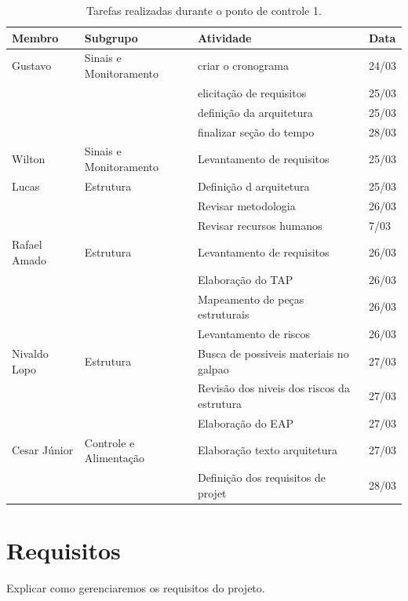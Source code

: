 \begin{table}[!htbp]
  \begin{center}
  \caption{\label{tarefas}Tarefas realizadas durante o ponto de controle 1.}
  \begin{tabular}{|l|l|l|l|}
  \hline
  \textbf{Membro} & \textbf{Subgrupo} & \textbf{Atividade} & \textbf{Data} \\ \hline\hline
  Gustavo & Sinais e Monitoramento & criar o cronograma & 24/03 \\ \hline
   &  & elicitação de requisitos & 25/03 \\ \hline
   &  & definição da arquitetura & 25/03 \\ \hline
   &  & finalizar seção do tempo & 28/03 \\ \hline
  Wilton & Sinais e Monitoramento & Levantamento de requisitos & 25/03 \\ \hline
  Lucas & Estrutura & Definição d arquitetura & 25/03 \\ \hline
   &  & Revisar metodologia & 26/03 \\ \hline
   &  & Revisar recursos humanos & 7/03 \\ \hline
  Rafael Amado & Estrutura & Levantamento de requisitos  & 26/03 \\ \hline
   &  & Elaboração do TAP & 26/03 \\ \hline
   &  & Mapeamento de peças estruturais & 26/03 \\ \hline
   &  & Levantamento de riscos & 26/03 \\ \hline
  Nivaldo Lopo & Estrutura & Busca de possiveis materiais no galpao & 27/03 \\ \hline
   &  & Revisão dos niveis dos riscos da estrutura & 27/03 \\ \hline
   &  & Elaboração do EAP & 27/03 \\ \hline
  Cesar Júnior & Controle e Alimentação & Elaboração texto arquitetura  & 27/03 \\ \hline
   &  & Definição dos requisitos de projet & 28/03 \\ \hline
  \end{tabular}
  \end{center}
\end{table}

\section{Requisitos}

Explicar como gerenciaremos os requisitos do projeto.

